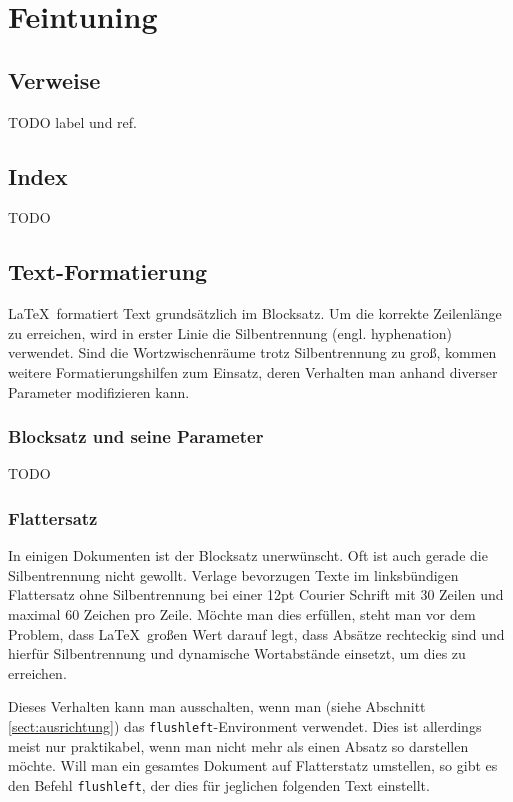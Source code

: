 
\chapter{Feintuning}


\section{Verweise}\label{sect:verweise}

TODO label und ref.

\section{Index}

TODO

\section{Text-Formatierung}

\LaTeX\ formatiert Text grundsätzlich im Blocksatz. Um die korrekte Zeilenlänge zu erreichen, wird in erster Linie die Silbentrennung (engl. hyphenation) verwendet. Sind die Wortzwischenräume trotz Silbentrennung zu groß, kommen weitere Formatierungshilfen zum Einsatz, deren Verhalten man anhand diverser Parameter modifizieren kann.

\subsection{Blocksatz und seine Parameter}

TODO

\subsection{Flattersatz}

\begin{flushleft}
In einigen Dokumenten ist der Blocksatz unerwünscht. Oft ist auch gerade die Silbentrennung nicht gewollt. Verlage bevorzugen Texte im linksbündigen Flattersatz ohne Silbentrennung bei einer 12pt Courier Schrift mit 30 Zeilen und maximal 60 Zeichen pro Zeile. Möchte man dies erfüllen, steht man vor dem Problem, dass \LaTeX\ großen Wert darauf legt, dass Absätze rechteckig sind und hierfür Silbentrennung und dynamische Wortabstände einsetzt, um dies zu erreichen. 

Dieses Verhalten kann man ausschalten, wenn man (siehe Abschnitt \ref{sect:ausrichtung}) das \texttt{flushleft}-Environment verwendet. Dies ist allerdings meist nur praktikabel, wenn man nicht mehr als einen Absatz so darstellen möchte. Will man ein gesamtes Dokument auf Flatterstatz umstellen, so gibt es den Befehl \texttt{flushleft}, der dies für jeglichen folgenden Text einstellt. 

\end{flushleft}


